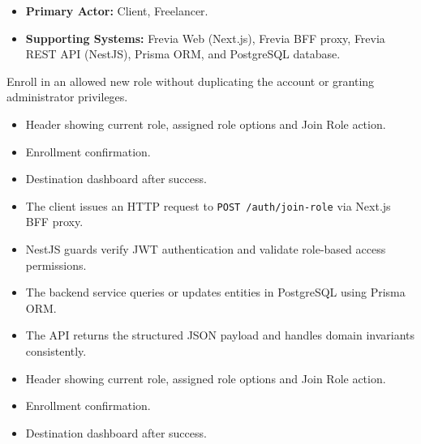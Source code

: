 
\begin{itemize}[leftmargin=1.6em,topsep=3pt,itemsep=2pt,parsep=0pt,label=$\bullet$]
    \item \textbf{Primary Actor:} Client, Freelancer.
    \item \textbf{Supporting Systems:} Frevia Web (Next.js), Frevia BFF proxy, Frevia REST API (NestJS), Prisma ORM, and PostgreSQL database.
\end{itemize}

\noindent Enroll in an allowed new role without duplicating the account or granting administrator privileges.

\begin{itemize}[leftmargin=1.6em,topsep=3pt,itemsep=2pt,parsep=0pt,label=$\bullet$]
    \item Header showing current role, assigned role options and Join Role action.
    \item Enrollment confirmation.
    \item Destination dashboard after success.
\end{itemize}

\begin{itemize}[leftmargin=1.6em,topsep=3pt,itemsep=2pt,parsep=0pt,label=$\bullet$]
    \item The client issues an HTTP request to \texttt{POST /\allowbreak{}auth/\allowbreak{}join-\allowbreak{}role} via Next.js BFF proxy.
    \item NestJS guards verify JWT authentication and validate role-based access permissions.
    \item The backend service queries or updates entities in PostgreSQL using Prisma ORM.
    \item The API returns the structured JSON payload and handles domain invariants consistently.
\end{itemize}

\begin{itemize}[leftmargin=1.6em,topsep=3pt,itemsep=2pt,parsep=0pt,label=$\bullet$]
    \item Header showing current role, assigned role options and Join Role action.
    \item Enrollment confirmation.
    \item Destination dashboard after success.
\end{itemize}


